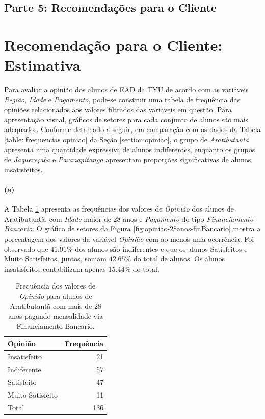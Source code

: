 \documentclass[10pt,a4paper,oneside]{article}
\newcommand{\arat}{Aratibutantã\xspace}
\newcommand{\jaqu}{Jaquereçaba\xspace}
\newcommand{\para}{Paranapitanga\xspace}
\begin{document}
\FloatBarrier
\clearpage
\begin{center}
\section*{Parte 5: Recomendações para o Cliente}
\end{center}

\section{Recomendação para o Cliente: Estimativa}
\label{section:estimativa}

Para avaliar a opinião dos alunos de EAD da TYU de acordo com as variáveis \textit{Região}, \textit{Idade} e \textit{Pagamento}, pode-se construir uma tabela de frequência das opiniões relacionados aos valores filtrados das variáveis em questão. Para apresentação visual, gráficos de setores para cada conjunto de alunos são mais adequados. Conforme detalhado a seguir, em comparação com os dados da Tabela \ref{table: frequencias opiniao} da Seção \ref{section:opiniao}, o grupo de \textit{\arat} apresenta uma quantidade expressiva de alunos indiferentes, enquanto os grupos de \textit{\jaqu} e \textit{\para} apresentam proporções significativas de alunos insatisfeitos.

\paragraph{(a)} A Tabela \ref{table:opiniao-28anos-finBancario} apresenta as frequências dos valores de \textit{Opinião} dos alunos de \arat, com \textit{Idade} maior de 28 anos e \textit{Pagamento} do tipo \textit{Financiamento Bancário}. O gráfico de setores da Figura \ref{fig:opiniao-28anos-finBancario} mostra a porcentagem dos valores da variável \textit{Opinião} com ao menos uma ocorrência.
Foi observado que $41.91\%$ dos alunos são indiferentes e que os alunos Satisfeitos e Muito Satisfeitos, juntos, somam $42.65\%$ do total de alunos. Os alunos insatisfeitos contabilizam apenas $15.44\%$ do total.


\begin{table}[!h]
	\small
	\centering
	\caption{Frequência dos valores de \textit{Opinião} para alunos de \arat com mais de 28 anos pagando mensalidade via Financiamento Bancário.}
	\label{table:opiniao-28anos-finBancario}
	\begin{tabular}{l r}
		\toprule
		\textbf{Opinião} & \textbf{Frequência} \\
		\midrule
		Insatisfeito     &  21 \\
		Indiferente      &  57 \\
		Satisfeito       &  47 \\
		Muito Satisfeito &  11 \\
		\midrule
		Total            &  136 \\
		\bottomrule
	\end{tabular}
\end{table}
\end{document}
